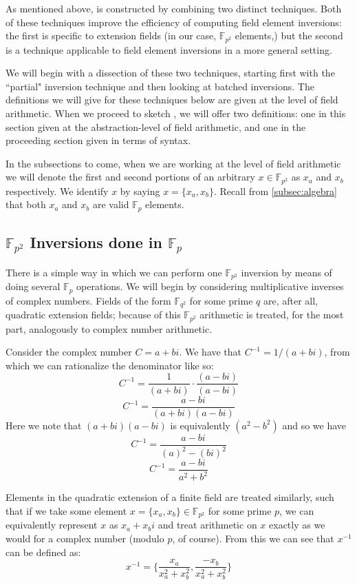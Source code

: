 As mentioned above,  is constructed by combining two distinct techniques. Both of these techniques improve the efficiency of computing field element inversions: the first is specific to extension fields (in our case, $\mathbb{F}_{p^{2}}$ elements,) but the second is a technique applicable to field element inversions in a more general setting.

We will begin with a dissection of these two techniques, starting first with the ``partial" inversion technique and then looking at batched inversions. The definitions we will give for these techniques below are given at the level of field arithmetic. When we proceed to sketch , we will offer two definitions: one in this section given at the abstraction-level of field arithmetic, and one in the proceeding section given in terms of \sidh syntax.

In the subsections to come, when we are working at the level of field arithmetic we will denote the first and second portions of an arbitrary $x \in \mathbb{F}_{p^{2}}$ as $x_{a}$ and $x_{b}$ respectively. We identify $x$ by saying $x = \{x_{a}, x_{b}\}$. Recall from \ref{subsec:algebra} that both $x_{a}$ and $x_{b}$ are valid $\mathbb{F}_{p}$ elements. 

\subsection{$\mathbb{F}_{p^{2}}$ Inversions done in $\mathbb{F}_{p}$}

There is a simple way in which we can perform one $\mathbb{F}_{p^{2}}$ inversion by means of doing several $\mathbb{F}_{p}$ operations. We will begin by considering multiplicative inverses of complex numbers. Fields of the form $\mathbb{F}_{q^{2}}$ for some prime $q$ are, after all, quadratic extension fields; because of this $\mathbb{F}_{p^{2}}$ arithmetic is treated, for the most part, analogously to complex number arithmetic.

Consider the complex number $C = a + bi$. We have that $C^{-1} = 1 / (a + bi)$, from which we can rationalize the denominator like so:\\
$$
C^{-1} = \frac {1}{(a + bi)} \cdot \frac{(a - bi)}{(a - bi)}
$$
$$
C^{-1} = \frac {a - bi}{(a + bi)(a - bi)}
$$
Here we note that $(a + bi)(a - bi)$ is equivalently $(a^2 - b^2)$ and so we have
$$
C^{-1} = \frac {a - bi}{(a)^2 - (bi)^2}
$$
$$
C^{-1} = \frac {a - bi}{a^2 + b^2}
$$

Elements in the quadratic extension of a finite field are treated similarly, such that if we take some element $x = \{x_{a}, x_{b}\} \in \mathbb{F}_{p^{2}}$ for some prime $p$, we can equivalently represent $x$ as $x_{a} + x_{b}i$ and treat arithmetic on $x$ exactly as we would for a complex number (modulo $p$, of course). From this we can see that $x^{-1}$ can be defined as:
$$
x^{-1} = \{\frac {x_{a}}{x_{a}^2 + x_{b}^2}, \frac {-x_{b}}{x_{a}^2 + x_{b}^2}\}
$$

